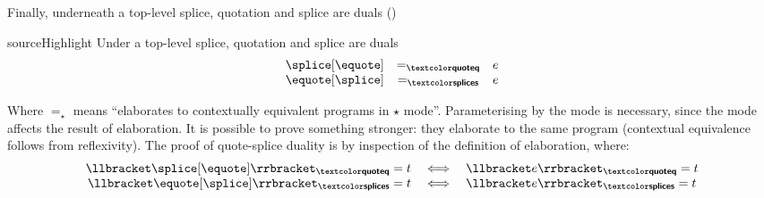 
Finally, underneath a top-level splice, quotation and splice are duals ()
\begin{theorem}{sourceHighlight}\label{thm:quote-splice-duality}
  Under a top-level splice, quotation and splice are duals
  \[\begin{array}{rcl}
\splice[{\equote}] & =_{\quotemode{}} & e \\
\equote[{\splice}] & =_{\splicemode{}} & e
\end{array}
\]
\end{theorem}
Where $=_{\star}$ means ``elaborates to contextually equivalent \coreLang{} programs in $\star$ mode''. Parameterising by the mode is necessary, since the mode affects the result of elaboration. It is possible to prove something stronger: they elaborate to the same \coreLang{} program (contextual equivalence follows from reflexivity). The proof of quote-splice duality is by inspection of the definition of elaboration, where:
\[\begin{array}{rcl}  
  \elaborate{\splice[{\equote}]}_{\quotemode{}} = t & \iff & \elaborate{e}_{\quotemode{}} = t\\
  \elaborate{\equote[{\splice}]}_{\splicemode{}} = t & \iff & \elaborate{e}_{\splicemode{}} = t
\end{array}
  \]


